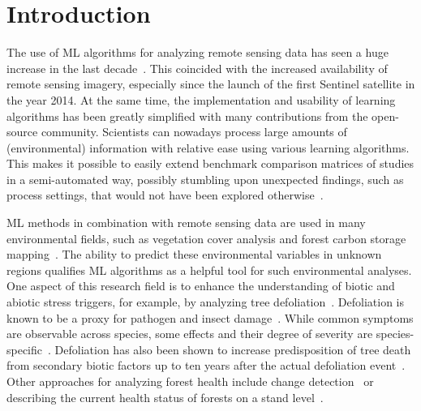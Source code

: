 \documentclass[remotesensing,article,accept,moreauthors,pdftex]{Definitions/mdpi}
\begin{document}
\section{Introduction}

The use of \ac{ML} algorithms for analyzing remote sensing data has seen a huge increase in the last decade~\cite{lary2016}.
This coincided with the increased availability of remote sensing imagery, especially since the launch of the first Sentinel satellite in the year 2014.
At the same time, the implementation and usability of learning algorithms has been greatly simplified with many contributions from the open-source community.
Scientists can nowadays process large amounts of (environmental) information with relative ease using various learning algorithms.
This makes it possible to easily extend benchmark comparison matrices of studies in a semi-automated way, possibly stumbling upon unexpected findings, such as process settings, that would not have been explored otherwise~\cite{ma2015}.


ML methods in combination with remote sensing data are used in many environmental fields, such as vegetation cover analysis and forest carbon storage mapping~\cite{mascaro2014, urban2018}.
The ability to predict these environmental variables in unknown regions qualifies ML algorithms as a helpful tool for such environmental analyses.
One aspect of this research field is to enhance the understanding of biotic and abiotic stress triggers, for example, by analyzing tree defoliation~\cite{hawrylo2018}.
Defoliation is known to be a proxy for pathogen and insect damage~\cite{pollastrini2016}.
While common symptoms are observable across species, some effects and their degree of severity are species-specific~\cite{gottardini2020}.
Defoliation has also been shown to increase predisposition of tree death from secondary biotic factors up to ten years after the actual defoliation event~\cite{oliva2016}.
Other approaches for analyzing forest health include change detection~\cite{zhang2016} or describing the current health status of forests on a stand level~\cite{townsend2012}.
\end{document}
